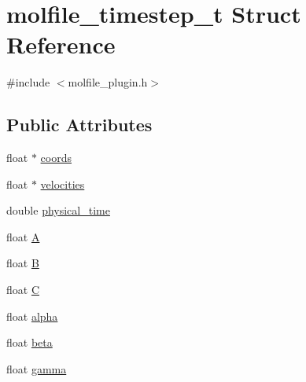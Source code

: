 \hypertarget{structmolfile__timestep__t}{\section{molfile\-\_\-timestep\-\_\-t \-Struct \-Reference}
\label{structmolfile__timestep__t}
}


{\ttfamily \#include $<$molfile\-\_\-plugin.\-h$>$}

\subsection*{\-Public \-Attributes}
\begin{DoxyCompactItemize}
\item 
float $\ast$ \hyperlink{structmolfile__timestep__t_a8095ee7fd2ec8ae513c6c6662c52f516}{coords}
\item 
float $\ast$ \hyperlink{structmolfile__timestep__t_acbc159e9adef19c860d42beab1e5cb96}{velocities}
\item 
double \hyperlink{structmolfile__timestep__t_a4ee1422c39ad8f4eadc37e3dda508746}{physical\-\_\-time}
\end{DoxyCompactItemize}
{\bf }\par
\begin{DoxyCompactItemize}
\item 
float \hyperlink{structmolfile__timestep__t_a5affc2a7fac90f0e14209b9ffaaa78d8}{\-A}
\item 
float \hyperlink{structmolfile__timestep__t_ad3556bfaf3538b6cec9c0972419cfba1}{\-B}
\item 
float \hyperlink{structmolfile__timestep__t_a9d2ab348266a6d35067fc08f991f2885}{\-C}
\item 
float \hyperlink{structmolfile__timestep__t_a538f77d57dc086e8c35bdcbfe3aee7dc}{alpha}
\item 
float \hyperlink{structmolfile__timestep__t_a6daa01b5d3f561c7dba3c312ef902768}{beta}
\item 
float \hyperlink{structmolfile__timestep__t_a74948ba5f866c2c0c7b32195cf39e378}{gamma}
\end{DoxyCompactItemize}




